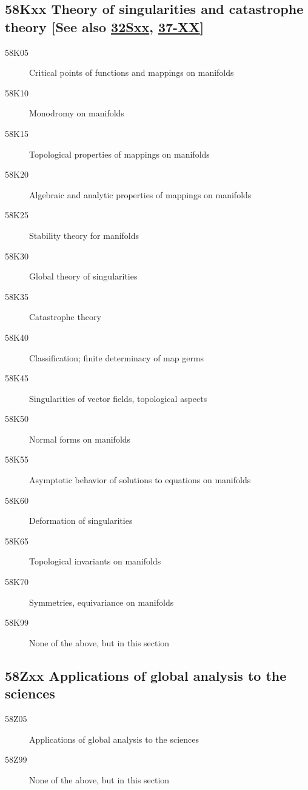 \documentclass[letterpaper]{article}
\begin{document}
\subsection*{58Kxx  Theory of singularities and catastrophe theory [See also \hyperref[32Sxx]{32Sxx}, \hyperref[37-XX]{37-XX}] }\label{58Kxx}
\begin{description}  
\item [58K05]\label{58K05} Critical points of functions and mappings on manifolds
\item [58K10]\label{58K10} Monodromy on manifolds
\item [58K15]\label{58K15} Topological properties of mappings on manifolds
\item [58K20]\label{58K20} Algebraic and analytic properties of mappings on manifolds
\item [58K25]\label{58K25} Stability theory for manifolds
\item [58K30]\label{58K30} Global theory of singularities
\item [58K35]\label{58K35} Catastrophe theory
\item [58K40]\label{58K40} Classification; finite determinacy of map germs
\item [58K45]\label{58K45} Singularities of vector fields, topological aspects
\item [58K50]\label{58K50} Normal forms on manifolds
\item [58K55]\label{58K55} Asymptotic behavior of solutions to equations on manifolds
\item [58K60]\label{58K60} Deformation of singularities
\item [58K65]\label{58K65} Topological invariants on manifolds
\item [58K70]\label{58K70} Symmetries, equivariance on manifolds
\item [58K99]\label{58K99} None of the above, but in this section
\end{description}
\subsection*{58Zxx   Applications of global analysis to the sciences}\label{58Zxx}
\begin{description}  
\item [58Z05]\label{58Z05}  Applications of global analysis to the sciences
\item [58Z99]\label{58Z99} None of the above, but in this section
\end{description}
\end{document}
